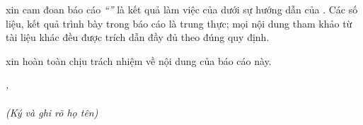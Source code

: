 
\ChungToi{} xin cam đoan báo cáo \textit{``\TieuDe''} là kết quả làm việc của
 dưới sự hướng dẫn của \GVHD{}.
Các số liệu, kết quả trình bày trong báo cáo là trung thực; mọi nội dung tham khảo
từ tài liệu khác đều được trích dẫn đầy đủ theo đúng quy định.

\ChungToi{} xin hoàn toàn chịu trách nhiệm về nội dung của báo cáo này.

\vspace{1.2cm}
\noindent\hfill
\begin{minipage}{0.48\linewidth}
  \centering
  \textit{\DiaDiem, \NgayKy}\\[4pt]
  \textbf{}\\
  {\small\textit{(Ký và ghi rõ họ tên)}}\\[1.8cm]
  \textbf{}
\end{minipage}
